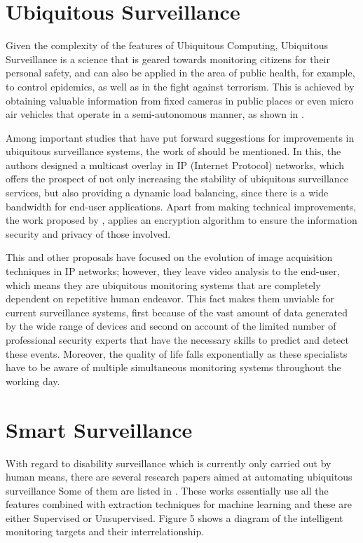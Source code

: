 \section{Ubiquitous Surveillance}

Given the complexity of the features of Ubiquitous Computing, Ubiquitous Surveillance is a science that is geared towards monitoring citizens for their personal safety, and can also be applied in the area of public health, for example, to control epidemics, as well as in the fight against terrorism. This is achieved by obtaining valuable information from fixed cameras in public places or even micro air vehicles that operate in a semi-autonomous manner, as shown in \cite{Nardi2006}.

Among important studies that have put forward suggestions for improvements in ubiquitous surveillance systems, the work of \cite{Chen2009} should be mentioned. In this, the authors designed a multicast overlay in IP (Internet Protocol) networks, which offers the prospect of not only increasing the stability of ubiquitous surveillance services, but also providing a dynamic load balancing, since there is a wide bandwidth for end-user applications. Apart from making technical improvements, the work proposed by \cite{Wang2008}, applies an encryption algorithm to ensure the information security and privacy of those involved.

This and other proposals have focused on the evolution of image acquisition techniques in IP networks; however, they leave video analysis to the end-user, which means they are ubiquitous monitoring systems that are completely dependent on repetitive human endeavor. This fact makes them unviable for current surveillance systems, first because of the vast amount of data generated by the wide range of devices and second on account of the limited number of professional security experts that have the necessary skills to predict and detect these events. Moreover, the quality of life falls exponentially as these specialists have to be aware of multiple simultaneous monitoring systems throughout the working day.


\section{Smart Surveillance}

With regard to disability surveillance which is currently only carried out by human means, there are several research papers aimed at automating  ubiquitous surveillance  Some of them are listed in \cite{Sodemann2012}.  These works essentially use all the features combined with extraction techniques for machine learning and these are either Supervised or Unsupervised. Figure 5 shows a diagram of the intelligent monitoring targets and their interrelationship.

